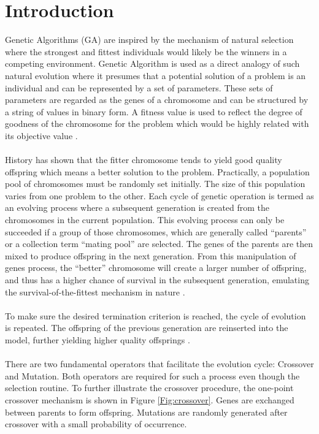 \documentclass[a4paper, 11pt]{article}
\begin{document}
\section{Introduction}\label{sec:intro}
    Genetic Algorithms (GA) are inspired by the mechanism of natural selection where the strongest and fittest
    individuals would likely be the winners in a competing environment. Genetic Algorithm is used as a direct 
    analogy of such natural evolution where it presumes that a potential solution of a problem is an individual 
    and can be represented by a set of parameters. These sets of parameters are regarded as the genes of a chromosome 
    and can be structured by a string of values in binary form. A fitness value is used to reflect the degree of 
    goodness of the chromosome for the problem which would be highly related with its objective value \cite{Man1997}.
    \\\\
    History has shown that the fitter chromosome tends to yield good quality offspring which means a
    better solution to the problem. Practically, a population pool of chromosomes must be randomly set initially. 
    The size of this population varies from one problem to the other. Each cycle of genetic operation is termed as 
    an evolving process where a subsequent generation is created from the chromosomes in the current population.  
    This evolving process can only be succeeded if a group of those chromosomes, which are generally called
    “parents” or a collection term “mating pool” are selected. The genes of the parents are then mixed to produce 
    offspring in the next generation. From this manipulation of genes process, the “better” chromosome will create a 
    larger number of offspring, and thus has a higher chance of survival in the subsequent generation, emulating the 
    survival-of-the-fittest mechanism in nature \cite{Man1997}.
    \\\\
    To make sure the desired termination criterion is reached, the cycle of evolution is repeated. The offspring of 
    the previous generation are reinserted into the model, further yielding higher quality offsprings \cite{Man1997}.
    \\\\
    There are two fundamental operators that facilitate the evolution cycle: Crossover and Mutation. Both operators 
    are required for such a process even though the selection routine. To further illustrate the crossover procedure, 
    the one-point crossover mechanism is shown in Figure \ref{Fig:crossover}. Genes are exchanged between parents to form 
    offspring. Mutations are randomly generated after crossover with a small probability of occurrence.
    
\end{document}
